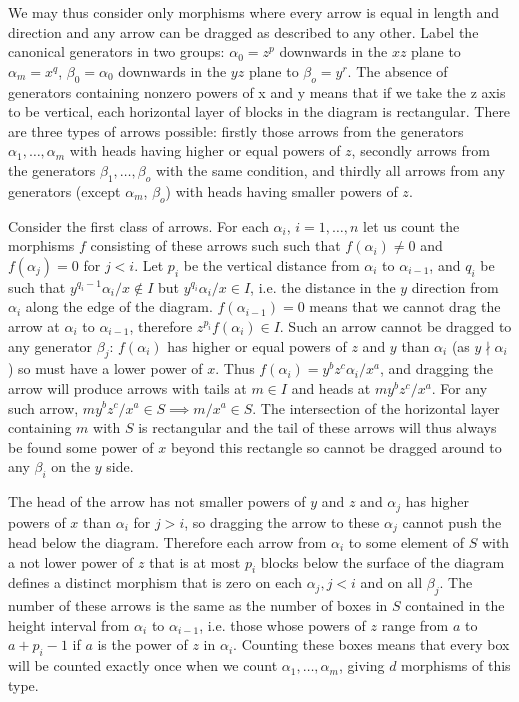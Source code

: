 \documentclass[a4paper,12pt,titlepage]{article}
\begin{document}
We may thus consider only morphisms where every arrow is equal in length and direction and any arrow can be dragged as described to any other.
Label the canonical generators in two groups: $\alpha_0=z^p$ downwards in the $xz$ plane to $\alpha_m=x^q$, $\beta_0=\alpha_0$ downwards in the $yz$ plane to $\beta_o=y^r$. 
The absence of generators containing nonzero powers of x and y means that if we take the z axis to be vertical, each horizontal layer of blocks in the diagram is rectangular.
There are three types of arrows possible: firstly those arrows from the generators $\alpha_1, \dots, \alpha_m$ with heads having higher or equal powers of $z$,
secondly arrows from the generators $\beta_1, \dots, \beta_o$ with the same condition,
and thirdly all arrows from any generators (except $\alpha_m$, $\beta_o$) with heads having smaller powers of $z$.

Consider the first class of arrows.
For each $\alpha_i$, $i=1, \dots, n$ let us count the morphisms $f$ consisting of these arrows such such that $f(\alpha_i) \neq 0$ and $f(\alpha_j)=0$ for $j<i$.
Let $p_i$ be the vertical distance from $\alpha_i$ to $\alpha_{i-1}$, and $q_i$ be such that $y^{q_i-1}\alpha_i/x \notin I$ but $y^{q_i}\alpha_i/x \in I$,
i.e. the distance in the $y$ direction from $\alpha_i$ along the edge of the diagram. $f(\alpha_{i-1})=0$ means that we cannot drag the arrow at $\alpha_i$ to $\alpha_{i-1}$,
therefore $z^{p_i}f(\alpha_i) \in I$. Such an arrow cannot be dragged to any generator $\beta_j$: 
$f(\alpha_i)$ has higher or equal powers of $z$ and $y$ than $\alpha_i$ (as $y \nmid \alpha_i$) so must have a lower power of $x$. Thus $f(\alpha_i)=y^bz^c\alpha_i/x^a$,
and dragging the arrow will produce arrows with tails at $m \in I$ and heads at $my^bz^c/x^a$. For any such arrow, $my^bz^c/x^a \in S \implies m/x^a \in S$.
The intersection of the horizontal layer containing $m$ with $S$ is rectangular and the tail of these arrows will thus always be found some power of $x$ beyond this rectangle
so cannot be dragged around to any $\beta_i$ on the $y$ side.

The head of the arrow has not smaller powers of $y$ and $z$ and $\alpha_j$ has higher powers of $x$ than $\alpha_i$ for $j>i$,
so dragging the arrow to these $\alpha_j$ cannot push the head below the diagram.
Therefore each arrow from $\alpha_i$ to some element of $S$ with a not lower power of $z$ that is at most $p_i$ blocks below the surface of the diagram
defines a distinct morphism that is zero on each $\alpha_j, j<i$ and on all $\beta_j$.
The number of these arrows is the same as the number of boxes in $S$ contained in the height interval from $\alpha_i$ to $\alpha_{i-1}$,
i.e. those whose powers of $z$ range from $a$ to $a+p_i-1$ if $a$ is the power of $z$ in $\alpha_i$.
Counting these boxes means that every box will be counted exactly once when we count $\alpha_1, \dots, \alpha_m$, giving $d$ morphisms of this type.
\end{document}
